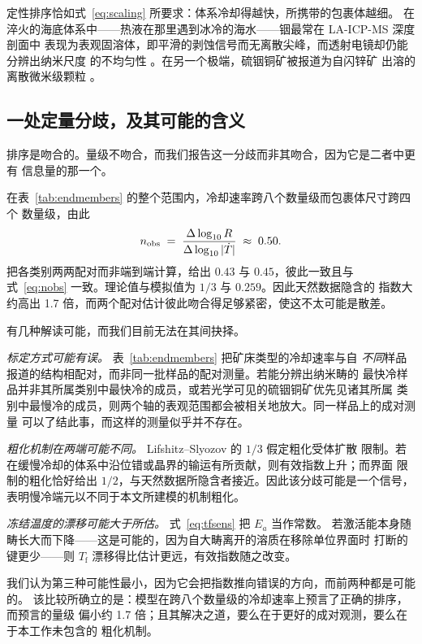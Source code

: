 \documentclass[11pt,a4paper]{ctexart}
\newcommand{\Tf}{T_{\mathrm{f}}}
\begin{document}
定性排序恰如式~\eqref{eq:scaling} 所要求：体系冷却得越快，所携带的包裹体越细。
在淬火的海底体系中——热液在那里遇到冰冷的海水——铟最常在 LA-ICP-MS 深度剖面中
表现为表观固溶体，即平滑的剥蚀信号而无离散尖峰，而透射电镜却仍能分辨出纳米尺度
的不均匀性 \citep{cook2009,frenzel2016}。在另一个极端，硫铟铜矿被报道为自闪锌矿
出溶的离散微米级颗粒 \citep{moura2007}。

\subsection{一处定量分歧，及其可能的含义}

排序是吻合的。量级不吻合，而我们报告这一分歧而非其吻合，因为它是二者中更有
信息量的那一个。

在表~\ref{tab:endmembers} 的整个范围内，冷却速率跨八个数量级而包裹体尺寸跨四个
数量级，由此
\begin{equation}
n_{\rm obs} \;=\; \frac{\Delta \log_{10} R}{\Delta \log_{10} |\dot{T}|}
           \;\approx\; 0.50 .
\label{eq:nobs}
\end{equation}
把各类别两两配对而非端到端计算，给出 $0.43$ 与 $0.45$，彼此一致且与
式~\eqref{eq:nobs} 一致。理论值与模拟值为 $1/3$ 与 $0.259$。因此天然数据隐含的
指数大约高出 1.7 倍，而两个配对估计彼此吻合得足够紧密，使这不太可能是散差。

有几种解读可能，而我们目前无法在其间抉择。

\emph{标定方式可能有误。} 表~\ref{tab:endmembers} 把矿床类型的冷却速率与自
\emph{不同}样品报道的结构相配对，而非同一批样品的配对测量。若能分辨出纳米畴的
最快冷样品并非其所属类别中最快冷的成员，或若光学可见的硫铟铜矿优先见诸其所属
类别中最慢冷的成员，则两个轴的表观范围都会被相关地放大。同一样品上的成对测量
可以了结此事，而这样的测量似乎并不存在。

\emph{粗化机制在两端可能不同。} Lifshitz--Slyozov 的 $1/3$ 假定粗化受体扩散
限制。若在缓慢冷却的体系中沿位错或晶界的输运有所贡献，则有效指数上升；而界面
限制的粗化恰好给出 $1/2$，与天然数据所隐含者接近。因此该分歧可能是一个信号，
表明慢冷端元以不同于本文所建模的机制粗化。

\emph{冻结温度的漂移可能大于所估。} 式~\eqref{eq:tfsens} 把 $E_a$ 当作常数。
若激活能本身随畴长大而下降——这是可能的，因为自大畴离开的溶质在移除单位界面时
打断的键更少——则 $\Tf$ 漂移得比估计更远，有效指数随之改变。

我们认为第三种可能性最小，因为它会把指数推向错误的方向，而前两种都是可能的。
该比较所确立的是：模型在跨八个数量级的冷却速率上预言了正确的排序，而预言的量级
偏小约 1.7 倍；且其解决之道，要么在于更好的成对观测，要么在于本工作未包含的
粗化机制。
\end{document}
